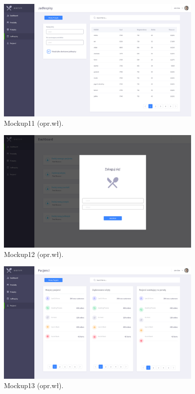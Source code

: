 \begin{minipage}{\textwidth}
    \begin{figure}[H]
        \centering\includegraphics[width=0.9\textwidth]{img/mockups/mockup11.png}
        \caption{Mockup11 (opr.wł).}\label{rysunek:mockup11}
    \end{figure}
\end{minipage}

\begin{minipage}{\textwidth}
    \begin{figure}[H]
        \centering\includegraphics[width=0.9\textwidth]{img/mockups/mockup12.png}
        \caption{Mockup12 (opr.wł).}\label{rysunek:mockup12}
    \end{figure}
\end{minipage}

\begin{minipage}{\textwidth}
    \begin{figure}[H]
        \centering\includegraphics[width=0.9\textwidth]{img/mockups/mockup13.png}
        \caption{Mockup13 (opr.wł).}\label{rysunek:mockup13}
    \end{figure}
\end{minipage}

